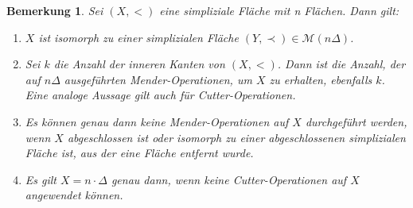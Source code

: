 \documentclass[12pt,titlepage]{article}
\newtheorem{bemerkung}{Bemerkung}[section]
\begin{document}
  \begin{bemerkung}
  Sei $(X,<)$ eine simpliziale Fläche mit n Flächen. Dann gilt: 
  \begin{enumerate}
  \item $X$ ist isomorph zu einer simplizialen Fläche $(Y,\prec) \in \mathcal{M}(n\Delta)$.
  \item Sei $k$ die Anzahl der inneren Kanten von $(X,<)$. Dann ist die Anzahl, der auf $n\Delta$ ausgeführten Mender-Operationen, um $X$ zu erhalten, ebenfalls $k$. Eine analoge Aussage gilt auch für Cutter-Operationen.
  \item Es können genau dann keine Mender-Operationen auf $X$ durchgeführt werden, wenn $X$ abgeschlossen ist oder isomorph zu einer abgeschlossenen simplizialen Fläche ist, aus der eine Fläche entfernt wurde.
  \item Es gilt $X=n \cdot \Delta$ genau dann, wenn keine Cutter-Operationen auf $X$ angewendet können.
  \end{enumerate}
  \end{bemerkung}
  
\end{document}
